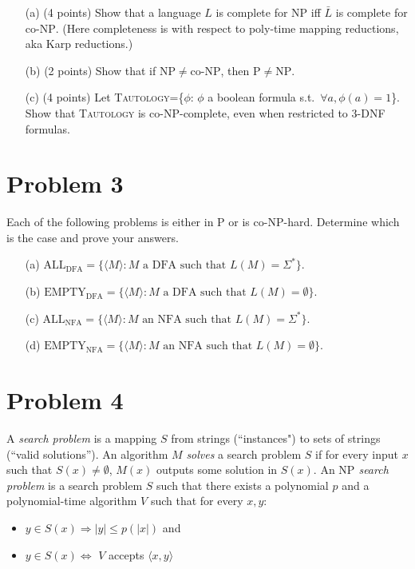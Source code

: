 \documentclass[12pt]{article}
\newcommand{\NP}{\mathrm{NP}}
\newcommand{\PTIME}{\mathrm{P}}
\newcommand{\coNP}{\mbox{co-NP}}
\newcommand{\textprob}[1]{\textsc{#1}}
\begin{document}
\begin{itemize}
\item[(a)] (4 points) Show that a language $L$ is complete for $\NP$ iff $\bar{L}$ is complete for $\coNP$. (Here completeness is with respect to poly-time mapping reductions, aka Karp reductions.)
\item[(b)] (2 points) Show that if $\NP \not= \coNP$, then $\PTIME \not= \NP$.
\item[(c)] (4 points) Let \textprob{Tautology}=\{$\phi$: $\phi$ a boolean formula s.t.\ $\forall a,\phi(a)=1$\}. Show that \textprob{Tautology} is $\coNP$-complete, even when restricted to 3-DNF formulas. 
\end{itemize}

\section*{Problem 3}

Each of the following problems is either in $\PTIME$ or is $\coNP$-hard.  Determine which is the case and prove your answers.

\begin{itemize}
\item[(a)] $\mathrm{ALL_{DFA}} = \{\langle M\rangle : \mbox{$M$ a DFA such that $L(M)=\Sigma^*$}\}$.
\item[(b)] $\mathrm{EMPTY_{DFA}} = \{\langle M\rangle : \mbox{$M$ a DFA such that $L(M)=\emptyset$}\}$.
\item[(c)] $\mathrm{ALL_{NFA}} = \{\langle M\rangle : \mbox{$M$ an NFA such that $L(M)=\Sigma^*$}\}$.
\item[(d)] $\mathrm{EMPTY_{NFA}} = \{\langle M\rangle : \mbox{$M$ an NFA such that $L(M)=\emptyset$}\}$.
\end{itemize}

\section*{Problem 4}

A \emph{search problem} is a mapping $S$ from strings (``instances") to sets of strings (``valid solutions''). An algorithm $M$ {\em solves} a search problem $S$ if for every input $x$ such that $S(x) \neq \emptyset$, $M(x)$ outputs some solution in $S(x)$. An {\em $\NP$ search problem} is a search problem $S$ such that there exists a polynomial $p$ and a polynomial-time algorithm $V$ such that for every $x,y$:
\begin{itemize}
\item $y \in S(x) \Rightarrow |y| \leq p(|x|)$ and
\item $y \in S(x) \iff$ $V$ accepts $\langle x,y \rangle$
\end{itemize}
\end{document}
